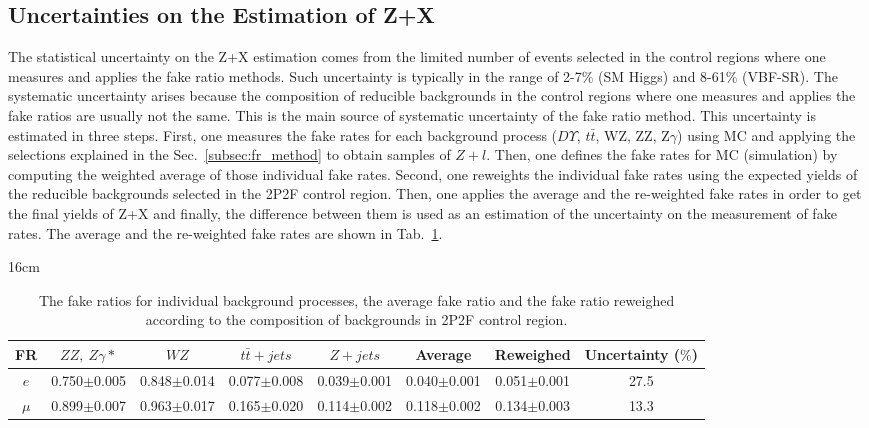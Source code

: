 \subsection{Uncertainties on the Estimation of Z+X}
The statistical uncertainty on the Z+X estimation comes from the limited number of events selected in the control regions where one measures and applies the fake ratio methods. Such uncertainty is typically in the range of 2-7$\%$ (SM Higgs) and 8-61$\%$ (VBF-SR). The systematic uncertainty arises because the composition of reducible backgrounds in the control regions where one measures and applies the fake ratios are usually not the same. This is the main source of systematic uncertainty of the fake ratio method. This uncertainty is estimated in three steps. First, one measures the fake rates for each background process ($D\varUpsilon$, $t\bar{t}$, WZ, ZZ, Z$\gamma$) using MC and applying the selections explained in the Sec.~\ref{subsec:fr_method} to obtain samples of $Z+l$. Then, one defines the fake rates for MC (simulation) by computing the weighted average of those individual fake rates. Second, one reweights the individual fake rates using the expected yields of the reducible backgrounds selected in the 2P2F control region. Then, one applies the average and the re-weighted fake rates in order to get the final yields of Z+X and finally, the difference between them is used as an estimation of the uncertainty on the measurement of fake rates. The average and the re-weighted fake rates are shown in Tab.~\ref{tab:fake_rate_overall_systematic}.

\begin{table}[hbtp]{16cm}
	\centering
	\caption{The fake ratios for individual background processes, the average fake ratio and the fake ratio reweighed according to the composition of backgrounds in 2P2F control region.}
	\scriptsize
	\begin{tabular}{c|c|c|c|c|c|c|c}
		\hline
		\rowcolor{light_gray}
		FR    & $ZZ,~Z\gamma*$  & $WZ$            & $t\bar{t}+jets$ & $Z+jets$        & Average & Reweighed & Uncertainty ($\%$)\\
		\hline
		$e$   & 0.750$\pm$0.005 & 0.848$\pm$0.014 & 0.077$\pm$0.008 & 0.039$\pm$0.001 & 0.040$\pm$0.001 & 0.051$\pm$0.001  & 27.5\\
		$\mu$ & 0.899$\pm$0.007 & 0.963$\pm$0.017 & 0.165$\pm$0.020 & 0.114$\pm$0.002 & 0.118$\pm$0.002 & 0.134$\pm$0.003  & 13.3\\
		\hline
	\end{tabular}
	\label{tab:fake_rate_overall_systematic}	
\end{table}


